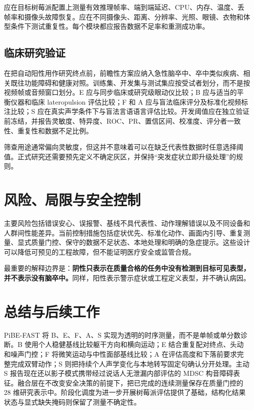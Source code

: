 \documentclass[11pt,a4paper]{article}
\begin{document}
应在目标树莓派配置上测量有效推理帧率、端到端延迟、CPU、内存、温度、丢帧率和摄像头故障恢复。应在不同摄像头、距离、分辨率、光照、眼镜、衣物和体型条件下测试重复性。每个模块都应报告数据不足率和重测成功率。

\subsection{临床研究验证}

在把自动阳性用作研究终点前，前瞻性方案应纳入急性脑卒中、卒中类似疾病、相关既往功能障碍和健康对照。训练集、开发集与测试集应按受试者划分，而不是按视频帧或音频窗口划分。E 应与同步临床或研究级眼动仪比较；B 应与适当的平衡仪器和临床 lateropulsion 评估比较；F 和 A 应与盲法临床评分及标准化视频标注比较；S 应在真实声学条件下与盲法言语语言评估比较。开发阈值应在独立验证前冻结，并报告灵敏度、特异度、ROC、PR、置信区间、校准度、评分者一致性、重复性和数据不足比例。

筛查用途通常偏向灵敏度，但这并不意味着可以在缺乏代表性数据时任意选择阈值。正式研究还需要预先定义不确定灰区，并保持“突发症状立即升级处理”的规则。

\section{风险、局限与安全控制}

主要风险包括错误安心、误报警、基线不具代表性、动作理解错误以及不同设备和人群间性能差异。当前控制措施包括症状优先、标准化动作、画面内引导、重复测量、显式质量门控、保守的数据不足状态、本地处理和明确的急症提示。这些设计可以降低可预见的工程故障，但不能证明医疗安全或监管合规。

最重要的解释边界是：\textbf{阴性只表示在质量合格的任务中没有检测到目标可见表型，并不表示没有脑卒中。}同样，阳性表示警示症状或工程定义表型，并不确认病因。

\section{总结与后续工作}

PiBE-FAST 将 B、E、F、A、S 实现为透明的时序测量，而不是单帧或单分数诊断。B 使用个人稳健基线比较躯干方向和横向运动；E 结合重复配对终点、头动和噪声门控；F 将微笑运动与中性面部基线比较；A 在评估高度和下落前要求完整完成双臂动作；S 则把持续个人声学变化与本地转写固定句确认分开处理。主动 S 报告现在还以影子模式携带经过说话人无泄漏内部评估的 MDSC 构音障碍表征。融合层在不改变安全决策的前提下，把已完成的连续测量保存在质量门控的 28 维研究表示中。阶段化调度为进一步开展树莓派评估提供了基础，结构化结果状态与显式缺失掩码则保留了测量不确定性。
\end{document}
